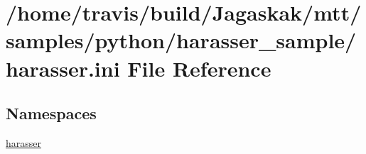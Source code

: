 \hypertarget{harasser_8ini}{\section{/home/travis/build/\-Jagaskak/mtt/samples/python/harasser\-\_\-sample/harasser.ini File Reference}
\label{harasser_8ini}
}
\subsection*{Namespaces}
\begin{DoxyCompactItemize}
\item 
\hyperlink{namespaceharasser}{harasser}
\end{DoxyCompactItemize}
